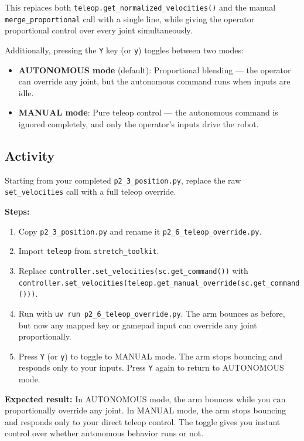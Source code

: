 \documentclass[11pt,a4paper]{article}
\begin{document}
This replaces both \texttt{teleop.get\_normalized\_velocities()} and the manual \texttt{merge\_proportional} call with a single line, while giving the operator proportional control over every joint simultaneously.

Additionally, pressing the \texttt{Y} key (or \texttt{y}) toggles between two modes:
\begin{itemize}
    \item \textbf{AUTONOMOUS mode} (default): Proportional blending — the operator can override any joint, but the autonomous command runs when inputs are idle.
    \item \textbf{MANUAL mode}: Pure teleop control — the autonomous command is ignored completely, and only the operator's inputs drive the robot.
\end{itemize}

\subsection*{Activity}

Starting from your completed \texttt{p2\_3\_position.py}, replace the raw \texttt{set\_velocities} call with a full teleop override.

\textbf{Steps:}
\begin{enumerate}
    \item Copy \texttt{p2\_3\_position.py} and rename it \texttt{p2\_6\_teleop\_override.py}.
    \item Import \texttt{teleop} from \texttt{stretch\_toolkit}.
    \item Replace \texttt{controller.set\_velocities(sc.get\_command())} with \texttt{controller.set\_velocities(teleop.get\_manual\_override(sc.get\_command()))}.
    \item Run with \texttt{uv run p2\_6\_teleop\_override.py}. The arm bounces as before, but now any mapped key or gamepad input can override any joint proportionally.
    \item Press \texttt{Y} (or \texttt{y}) to toggle to MANUAL mode. The arm stops bouncing and responds only to your inputs. Press \texttt{Y} again to return to AUTONOMOUS mode.
\end{enumerate}

\textbf{Expected result:} In AUTONOMOUS mode, the arm bounces while you can proportionally override any joint. In MANUAL mode, the arm stops bouncing and responds only to your direct teleop control. The toggle gives you instant control over whether autonomous behavior runs or not.
\end{document}
